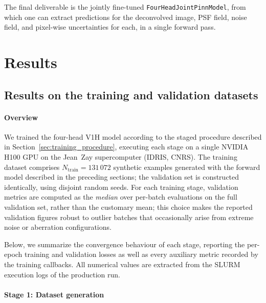 \documentclass{aa}
\begin{document}
The final deliverable is the jointly fine-tuned \texttt{FourHeadJointPinnModel}, from which one can extract predictions for the deconvolved image, PSF field, noise field, and pixel-wise uncertainties for each, in a single forward pass.

\section{Results}

\subsection{Results on the training and validation datasets}

\paragraph{Overview}

We trained the four-head V1H model according to the staged procedure described in Section~\ref{sec:training_procedure}, executing each stage on a single NVIDIA H100 GPU on the Jean~Zay supercomputer (IDRIS, CNRS). The training dataset comprises $N_\mathrm{train} = 131\,072$ synthetic examples generated with the forward model described in the preceding sections; the validation set is constructed identically, using disjoint random seeds. For each training stage, validation metrics are computed as the \emph{median} over per-batch evaluations on the full validation set, rather than the customary mean; this choice makes the reported validation figures robust to outlier batches that occasionally arise from extreme noise or aberration configurations.

Below, we summarize the convergence behaviour of each stage, reporting the per-epoch training and validation losses as well as every auxiliary metric recorded by the training callbacks. All numerical values are extracted from the SLURM execution logs of the production run.

\paragraph{Stage 1: Dataset generation}
\end{document}
